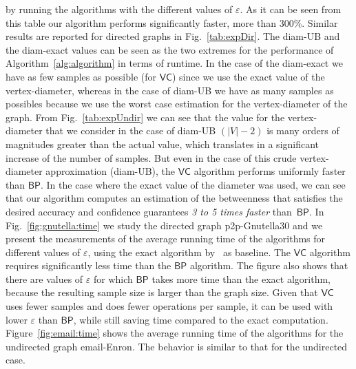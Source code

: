 by running the algorithms with the different values of $\varepsilon$. As it can
be seen from this table our algorithm performs significantly faster, more than
300\%. Similar results are reported for directed graphs in Fig.~\ref{tab:expDir}.
The diam-UB
and the diam-exact values can be seen as the two extremes for the performance of 
Algorithm~\ref{alg:algorithm} in terms of runtime. In the case of the diam-exact
we have as few samples as possible (for $\mathsf{VC}$) since we use the exact
value of the vertex-diameter, whereas in the case of diam-UB we have as many
samples as possibles because we use the worst case estimation for the
vertex-diameter of the graph.  %
From Fig.~\ref{tab:expUndir} we can see that the value for the
vertex-diameter that we consider in the case of diam-UB $(|V|-2)$ is many orders of
magnitudes greater than the actual value, which translates in a significant
increase of the number of samples. But even in the case of this crude
vertex-diameter approximation (diam-UB), the $\mathsf{VC}$ algorithm performs uniformly faster than
$\mathsf{BP}$. In the case where the exact value of the diameter was used, we
can see that our algorithm computes an estimation of the betweenness that
satisfies the desired accuracy and confidence guarantees \emph{3 to 5 times
faster} than~$\mathsf{BP}$. 
 In Fig.~\ref{fig:gnutella:time} we study
the directed graph p2p-Gnutella30 and we present the measurements of
the average running time of the algorithms for different values of
$\varepsilon$, using the exact algorithm by~\citet{Brandes01} as baseline. The
$\mathsf{VC}$ algorithm requires significantly less time than the $\mathsf{BP}$
algorithm. The figure also shows that there are values of $\varepsilon$ for
which $\mathsf{BP}$ takes more time than the exact algorithm, because the
resulting sample size is larger than the graph size. Given that $\mathsf{VC}$
uses fewer samples and does fewer operations per sample, it can be used with
lower $\varepsilon$ than $\mathsf{BP}$, while still saving time compared to the
exact computation. Figure~\ref{fig:email:time} shows the average running time of the
algorithms for the undirected graph email-Enron. The behavior is  similar to
that for the undirected case. %
